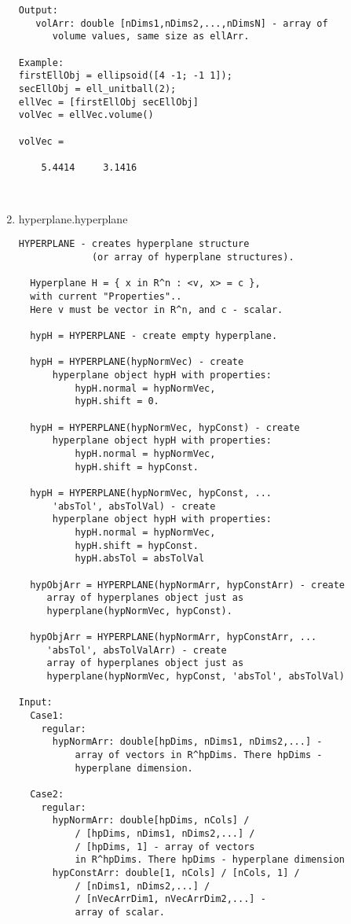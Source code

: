 \begin{enumerate}
\begin{lstlisting}
Output:
   volArr: double [nDims1,nDims2,...,nDimsN] - array of
      volume values, same size as ellArr.

Example:
firstEllObj = ellipsoid([4 -1; -1 1]);
secEllObj = ell_unitball(2);
ellVec = [firstEllObj secEllObj]
volVec = ellVec.volume()

volVec =

    5.4414     3.1416



\end{lstlisting}
\fontfamily{\familydefault}
\selectfont
\item {hyperplane.hyperplane}
\selectfont
\begin{lstlisting}
HYPERPLANE - creates hyperplane structure
             (or array of hyperplane structures).

  Hyperplane H = { x in R^n : <v, x> = c },
  with current "Properties"..
  Here v must be vector in R^n, and c - scalar.

  hypH = HYPERPLANE - create empty hyperplane.

  hypH = HYPERPLANE(hypNormVec) - create
      hyperplane object hypH with properties:
          hypH.normal = hypNormVec,
          hypH.shift = 0.

  hypH = HYPERPLANE(hypNormVec, hypConst) - create
      hyperplane object hypH with properties:
          hypH.normal = hypNormVec,
          hypH.shift = hypConst.

  hypH = HYPERPLANE(hypNormVec, hypConst, ...
      'absTol', absTolVal) - create
      hyperplane object hypH with properties:
          hypH.normal = hypNormVec,
          hypH.shift = hypConst.
          hypH.absTol = absTolVal

  hypObjArr = HYPERPLANE(hypNormArr, hypConstArr) - create
     array of hyperplanes object just as
     hyperplane(hypNormVec, hypConst).

  hypObjArr = HYPERPLANE(hypNormArr, hypConstArr, ...
     'absTol', absTolValArr) - create
     array of hyperplanes object just as
     hyperplane(hypNormVec, hypConst, 'absTol', absTolVal)

Input:
  Case1:
    regular:
      hypNormArr: double[hpDims, nDims1, nDims2,...] -
          array of vectors in R^hpDims. There hpDims -
          hyperplane dimension.

  Case2:
    regular:
      hypNormArr: double[hpDims, nCols] /
          / [hpDims, nDims1, nDims2,...] /
          / [hpDims, 1] - array of vectors
          in R^hpDims. There hpDims - hyperplane dimension
      hypConstArr: double[1, nCols] / [nCols, 1] /
          / [nDims1, nDims2,...] /
          / [nVecArrDim1, nVecArrDim2,...] -
          array of scalar.


\end{lstlisting}
\end{enumerate}
